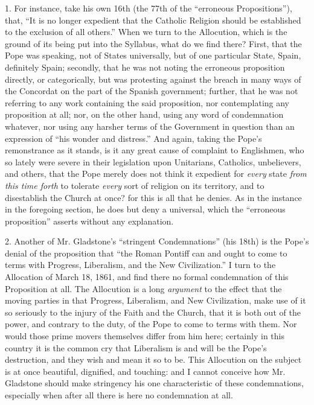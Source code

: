 1. For instance, take his own 16th (the 77th of the ``erroneous
Propositions''), that, ``It is no longer expedient that the
Catholic Religion should be established to the exclusion of all
others.'' When we turn to the Allocution, which is the ground of its
being put into the Syllabus, what do we find there? First, that the Pope
was speaking, not of States universally, but of one particular State,
Spain, definitely Spain; secondly, that he was not noting the erroneous
proposition directly, or categorically, but was protesting against the
breach in many ways of the Concordat on the part of the Spanish
government; further, that he was not referring to any work containing
the said proposition, nor contemplating any proposition at all; nor, on
the other hand, using any word of condemnation whatever, nor using any
harsher terms of the Government in question than an expression of
``his wonder and distress.'' And again, taking the Pope's
remonstrance as it stands, is it any great cause of complaint to
Englishmen, who so lately were severe in their legislation upon
Unitarians, Catholics, unbelievers, and others, that the Pope merely
does not think it expedient for \emph{every} state \emph{from this time
forth} to tolerate \emph{every} sort of religion on its territory,
and to disestablish the Church at once? for this is all that he denies.
As in the instance in the foregoing section, he does but deny a
universal, which the ``erroneous proposition'' asserts without
any explanation.

2. Another of Mr. Gladstone's ``stringent Condemnations''
(his 18th) is the Pope's denial of the proposition that ``the Roman
Pontiff can and ought to come to terms with Progress, Liberalism, and
the New Civilization.'' I turn to the Allocation of March 18, 1861,
and find there no formal condemnation of this Proposition at all. The
Allocution is a long \emph{argument} to the effect that the moving
parties in that Progress, Liberalism, and New Civilization, make use of
it so seriously to the injury of the Faith and the Church, that it is
both out of the power, and contrary to the duty, of the Pope to come to
terms with them. Nor would those prime movers themselves differ from him
here; certainly in this country it is the common cry that Liberalism is
and will be the Pope's destruction, and they wish and mean it so to be.
This Allocution on the subject is at once beautiful, dignified, and
touching: and I cannot conceive how Mr. Gladstone should make stringency
his one characteristic of these condemnations, especially when after all
there is here no condemnation at all.

